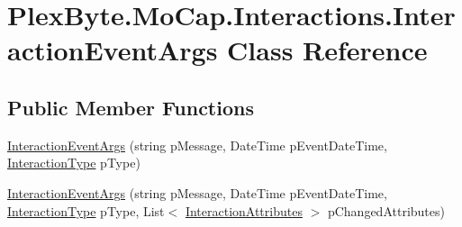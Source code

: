 \hypertarget{class_plex_byte_1_1_mo_cap_1_1_interactions_1_1_interaction_event_args}{}\section{Plex\+Byte.\+Mo\+Cap.\+Interactions.\+Interaction\+Event\+Args Class Reference}
\label{class_plex_byte_1_1_mo_cap_1_1_interactions_1_1_interaction_event_args}
\subsection*{Public Member Functions}
\begin{DoxyCompactItemize}
\item 
\hyperlink{class_plex_byte_1_1_mo_cap_1_1_interactions_1_1_interaction_event_args_a6983a639d6fc1adf5279b05857690e46}{Interaction\+Event\+Args} (string p\+Message, Date\+Time p\+Event\+Date\+Time, \hyperlink{namespace_plex_byte_1_1_mo_cap_1_1_interactions_a6e7bea333446664bbce2bb296db25e31}{Interaction\+Type} p\+Type)
\item 
\hyperlink{class_plex_byte_1_1_mo_cap_1_1_interactions_1_1_interaction_event_args_ad97190180e51ffbff38f9b7e1c78944c}{Interaction\+Event\+Args} (string p\+Message, Date\+Time p\+Event\+Date\+Time, \hyperlink{namespace_plex_byte_1_1_mo_cap_1_1_interactions_a6e7bea333446664bbce2bb296db25e31}{Interaction\+Type} p\+Type, List$<$ \hyperlink{namespace_plex_byte_1_1_mo_cap_1_1_interactions_aa78ff2ea1c7ea92537cb6b3552b6a7da}{Interaction\+Attributes} $>$ p\+Changed\+Attributes)
\end{DoxyCompactItemize}
